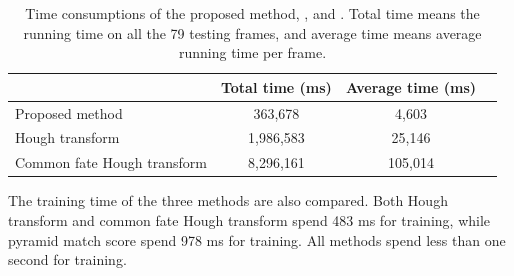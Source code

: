 \documentclass[paper]{ieice}
\begin{document}
\begin{table}[h]
\centering
\begin{tabular}{lccc}
     \hline
     \hline
                               & Total time (ms) & Average time (ms)   \\
    \hline
    Proposed method      &	363,678 & 4,603 \\
    Hough transform      & 	1,986,583 & 25,146 \\
    Common fate Hough transform       &	8,296,161 & 105,014\\
   \hline
\end{tabular}
\caption[Comparisons of time consumptions]{Time consumptions of the proposed method, \cite{ac9}, and \cite{wang1}. Total time means the running time on all the 79 testing frames, and average time means average running time per frame.}\label{c5tb:tb1}
\end{table}

The training time of the three methods are also compared. Both Hough transform and common fate Hough transform spend 483 ms for training, while pyramid match score spend 978 ms for training. All methods spend less than one second for training.

\end{document}
